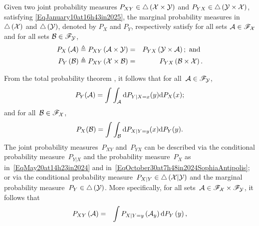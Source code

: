 \documentclass[lettersize,onecolumn]{IEEEtran}
\begin{document}
\begin{definition}[Marginals]
Given two joint probability measures $P_{XY} \in \triangle\left( \mathcal X \times \mathcal Y \right)$ and $P_{YX} \in \triangle\left( \mathcal Y 
\times \mathcal X \right)$, satisfying \eqref{EqJanuary10at16h43in2025}, the marginal probability measures in $\triangle\left( \mathcal X 
\right)$ and $\triangle\left( \mathcal Y \right)$, denoted by $P_X$ and $P_Y$, respectively satisfy for all  sets $\mathcal A \in  \mathscr{F}_{\mathcal X}$ and for all sets $\mathcal B \in \mathscr{F}_{\mathcal Y}$,
\begin{eqnarray}
\label{eqmargpx}
P_{X}\left( \mathcal A \right) & \triangleq  P_{XY}\left( \mathcal A \times \mathcal Y \right) = & P_{YX}\left( \mathcal Y \times \mathcal A 
\right) ; \mbox{ and } \\
\label{eqmargpy}
P_{Y}\left( \mathcal B \right) & \triangleq  P_{XY}\left( \mathcal X \times \mathcal B \right) = & P_{YX}\left( \mathcal B \times \mathcal X 
\right).
\end{eqnarray}
\end{definition}
From the total probability theorem \cite[Theorem~4.5.2]{ash2000probability}, it follows that for all~$\mathcal A \in \mathscr{F}
_{\mathcal Y}$,  
\begin{eqnarray}\label{eqmarginal1}
 P_Y(\mathcal A)  = \int \int_{\mathcal A} \mathrm{d}P_{Y | X = x}(y) \mathrm{d}P_X (x);
\end{eqnarray}
and for all~$\mathcal B \in \mathscr{F}_{\mathcal X}$, 
\begin{eqnarray}\label{eqmarginal2}
P_X(\mathcal B) =    \int \int_{\mathcal B} \mathrm{d}P_{X | Y = y}(x) \mathrm{d}P_Y(y).
\end{eqnarray}
%
The joint probability measures~$P_{XY}$ and~$P_{YX}$ can be described via the conditional probability measure~$P_{Y | X}$ 
and the probability measure~$P_{X}$ as in~\eqref{EqMay20at14h23in2024} and 
in~\eqref{EqOctober30at7h48in2024SophiaAntipolis}; or via the conditional probability measure~$P_{X | Y} \in \triangle\left( \mathcal X | \mathcal Y \right)$ and the marginal probability 
measure~$P_{Y} \in \triangle\left( \mathcal Y \right)$.
%
More specifically, for all sets~$\mathcal A \in  \mathscr{F}_{\mathcal X} \times \mathscr{F}_{\mathcal Y}$, it follows that
\begin{eqnarray}
\label{EqJun3at14h31in2024}
P_{XY }\left( \mathcal A \right) & = & \int P_{X | Y = y} \left( \mathcal A_{y}\right) \mathrm{d} P_{Y} \left( y\right),
\end{eqnarray}
\end{document}
